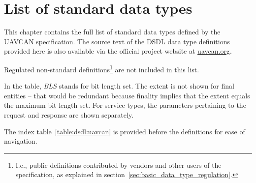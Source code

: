\chapter{List of standard data types}\label{sec:sdt}

This chapter contains the full list of standard data types defined by the UAVCAN specification.
The source text of the DSDL data type definitions provided here is also available via the
official project website at \href{http://uavcan.org}{uavcan.org}.

Regulated non-standard definitions\footnote{%
    I.e., public definitions contributed by vendors and other users
    of the specification, as explained in section~\ref{sec:basic_data_type_regulation}.
} are not included in this list.

In the table, \emph{BLS} stands for bit length set.
The extent is not shown for final entities -- that would be redundant because finality implies
that the extent equals the maximum bit length set.
For service types, the parameters pertaining to the request and response are shown separately.

The index table~\ref{table:dsdl:uavcan} is provided before the definitions for ease of navigation.

\clearpage{}
